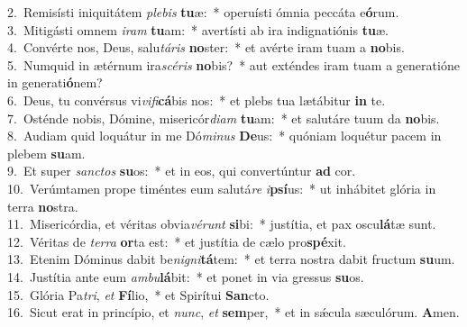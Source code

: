 {2.~}Remisísti iniquitátem \textit{ple}\textit{bis} \textbf{tu}æ:~* operuísti ómnia peccáta e\textbf{ó}rum.\\
{3.~}Mitigásti omnem \textit{i}\textit{ram} \textbf{tu}am:~* avertísti ab ira indignatiónis \textbf{tu}æ.\\
{4.~}Convérte nos, Deus, salu\textit{tá}\textit{ris} \textbf{no}ster:~* et avérte iram tuam a \textbf{no}bis.\\
{5.~}Numquid in ætérnum ira\textit{scé}\textit{ris} \textbf{no}bis?~* aut exténdes iram tuam a generatióne in generati\textbf{ó}nem?\\
{6.~}Deus, tu convérsus vi\textit{vi}\textit{fi}\textbf{cá}bis nos:~* et plebs tua lætábitur \textbf{in} te.\\
{7.~}Osténde nobis, Dómine, misericór\textit{di}\textit{am} \textbf{tu}am:~* et salutáre tuum da \textbf{no}bis.\\
{8.~}Audiam quid loquátur in me Dó\textit{mi}\textit{nus} \textbf{De}us:~* quóniam loquétur pacem in plebem \textbf{su}am.\\
{9.~}Et super \textit{san}\textit{ctos} \textbf{su}os:~* et in eos, qui convertúntur \textbf{ad} cor.\\
{10.~}Verúmtamen prope timéntes eum salutá\textit{re} \textit{i}\textbf{psí}us:~* ut inhábitet glória in terra \textbf{no}stra.\\
{11.~}Misericórdia, et véritas obvia\textit{vé}\textit{runt} \textbf{si}bi:~* justítia, et pax oscu\textbf{lá}tæ sunt.\\
{12.~}Véritas de \textit{ter}\textit{ra} \textbf{or}ta est:~* et justítia de cælo pro\textbf{spé}xit.\\
{13.~}Etenim Dóminus dabit be\textit{ni}\textit{gni}\textbf{tá}tem:~* et terra nostra dabit fructum \textbf{su}um.\\
{14.~}Justítia ante eum \textit{am}\textit{bu}\textbf{lá}bit:~* et ponet in via gressus \textbf{su}os.\\
{15.~}Glória Pa\textit{tri}, \textit{et} \textbf{Fí}lio,~* et Spirítui \textbf{San}cto.\\
{16.~}Sicut erat in princípio, et \textit{nunc}, \textit{et} \textbf{sem}per,~* et in sǽcula sæculórum. \textbf{A}men.\\
